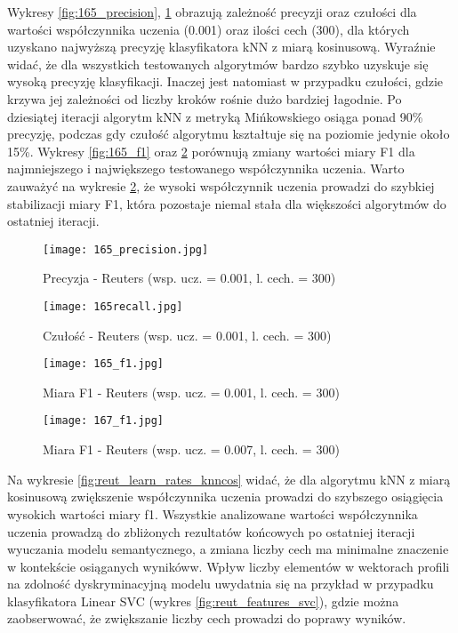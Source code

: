 \documentclass{pracamgr}
\begin{document}
Wykresy \ref{fig:165_precision}, \ref{fig:165recall} obrazują zależność precyzji oraz czułości dla wartości współczynnika uczenia (0.001) oraz ilości cech (300), dla których uzyskano najwyższą precyzję klasyfikatora kNN z miarą kosinusową. Wyraźnie widać, że dla wszystkich testowanych algorytmów bardzo szybko uzyskuje się wysoką precyzję klasyfikacji. Inaczej jest natomiast w przypadku czułości, gdzie krzywa jej zależności od liczby kroków rośnie dużo bardziej łagodnie. Po dziesiątej iteracji algorytm kNN z metryką Mińkowskiego osiąga ponad 90\% precyzję, podczas gdy czułość algorytmu kształtuje się na poziomie jedynie około 15\%. Wykresy \ref{fig:165_f1} oraz \ref{fig:167_f1} porównują zmiany wartości miary F1 dla najmniejszego i największego testowanego współczynnika uczenia. Warto zauważyć na wykresie \ref{fig:167_f1}, że wysoki współczynnik uczenia prowadzi do szybkiej stabilizacji miary F1, która pozostaje niemal stała dla większości algorytmów do ostatniej iteracji.

\begin{figure}[]
  \texttt{[image: 165\_precision.jpg]}
  \caption{Precyzja - Reuters (wsp. ucz. = 0.001, l. cech. = 300)}\label{fig:165_precision}
\endminipage\hfill
{}%
  \texttt{[image: 165recall.jpg]}
  \caption{Czułość - Reuters (wsp. ucz. = 0.001, l. cech. = 300)}\label{fig:165recall}
\endminipage
\end{figure}

\begin{figure}[]
  \texttt{[image: 165\_f1.jpg]}
  \caption{Miara F1 - Reuters (wsp. ucz. = 0.001, l. cech. = 300)}\label{fig:165_f1}
\endminipage\hfill
{}%
  \texttt{[image: 167\_f1.jpg]}
  \caption{Miara F1 - Reuters (wsp. ucz. = 0.007, l. cech. = 300)}\label{fig:167_f1}
\endminipage
\end{figure}

Na wykresie \ref{fig:reut_learn_rates_knncos} widać, że dla algorytmu kNN z miarą kosinusową zwiększenie współczynnika uczenia prowadzi do szybszego osiągięcia wysokich wartości miary f1. Wszystkie analizowane wartości współczynnika uczenia prowadzą do zbliżonych rezultatów końcowych po ostatniej iteracji wyuczania modelu semantycznego, a zmiana liczby cech ma minimalne znaczenie w kontekście osiąganych wynikóww. Wpływ liczby elementów w wektorach profili na zdolność dyskryminacyjną modelu uwydatnia się na przykład w przypadku klasyfikatora Linear SVC (wykres \ref{fig:reut_features_svc}), gdzie można zaobserwować, że zwiększanie liczby cech prowadzi do poprawy wyników.
\end{document}
